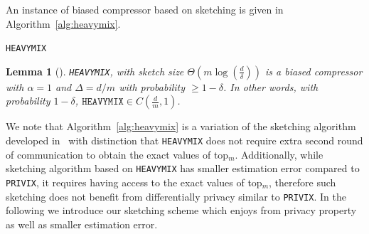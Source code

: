 \documentclass[twoside]{article}
\newtheorem{lemma}{Lemma}
\begin{document}
An instance of biased compressor based on sketching is given in Algorithm~\ref{alg:heavymix}.
\begin{algorithm}[t]
\caption{\texttt{HEAVYMIX}  }\label{alg:heavymix}
\begin{algorithmic}[1]
\end{algorithmic}
\end{algorithm}


\begin{lemma}[\cite{ivkin2019communication}]
\texttt{HEAVYMIX}, with sketch size $\Theta\left(m\log\left(\frac{d}{\delta}\right)\right)$ is a biased compressor with $\alpha=1$ and  $\Delta=d/m$ with probability $\geq1-\delta$. In other words, with probability $1-\delta$, $\texttt{HEAVYMIX}\in C(\frac{d}{m},1)$. 
\end{lemma}

We note that Algorithm~\ref{alg:heavymix} is a variation of the sketching algorithm developed in~\cite{ivkin2019communication} with distinction that \texttt{HEAVYMIX} does not require extra second round of communication to obtain the exact values of top$_m$. Additionally, while sketching algorithm based on \texttt{HEAVYMIX} has smaller estimation error compared to \texttt{PRIVIX}, it requires having access to the exact values of top$_m$, therefore such sketching does not benefit from differentially privacy similar to \texttt{PRIVIX}. In the following we introduce our sketching scheme which enjoys from privacy property as well as smaller estimation error. 
\end{document}
